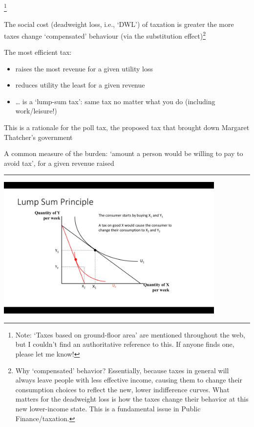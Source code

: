\documentclass[]{article}
\begin{document}
\footnote{Note: `Taxes based on ground-floor area' are mentioned
  throughout the web, but I couldn't find an authoritative reference to
  this. If anyone finds one, please let me know!}

The social cost (deadweight loss, i.e., `DWL') of taxation is greater
the more taxes change `compensated' behaviour (via the substitution
effect)\footnote{Why `compensated' behavior? Essentially, because taxes
  in general will always leave people with less effective income,
  causing them to change their consumption choices to reflect the new,
  lower indifference curves. What matters for the deadweight loss is how
  the taxes change their behavior at this new lower-income state. This
  is a fundamental issue in Public Finance/taxation.}

The most efficient tax:

\begin{itemize}
\item
  raises the most revenue for a given utility loss
\item
  reduces utility the least for a given revenue
\item
  \ldots{} is a `lump-sum tax': same tax no matter what you do
  (including work/leisure!)
\end{itemize}

This is a rationale for the poll tax, the proposed tax that brought down
Margaret Thatcher's government

A common measure of the burden: `amount a person would be willing to pay
to avoid tax', for a given revenue raised

\begin{center}\rule{0.5\linewidth}{\linethickness}\end{center}

\includegraphics[height=2.8in]{picsfigs/lumpsum1.png}
\end{document}

